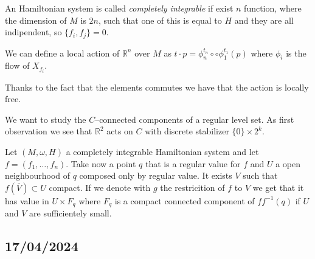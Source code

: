 \documentclass[misc]{subfiles}
\begin{document}
\begin{Dfn}
    An Hamiltonian system is called \textit{completely integrable} if exist $n$ function, where the dimension of $M$ is $2n$, such that one of this is equal to $H$ and they are all indipendent, so $\{f_i,f_j\}=0$.

    We can define a local action of $\mathbb{R}^n$ over $M$ as $t \cdot p=\phi_n^{t_n} \circ \circ \phi_1^{t_1}(p)$ where $\phi_i$ is the flow of $X_{f_i}$.
\end{Dfn}

\begin{Prp}
    Thanks to the fact that the elements commutes we have that the action is locally free.
\end{Prp}

\begin{Exp}
    We want to study the $C$--connected components of a regular level set. As first observation we see that $\mathbb{R}^2$ acts on $C$ with discrete stabilizer $\{0\} \times 2^k$.

    Let $(M,\omega,H)$ a completely integrable Hamiltonian system and let $f=(f_1,\dots,f_n)$. Take now a point $q$ that is a regular value for $f$ and $U$ a open neighbourhood of $q$ composed only by regular value. It exists $V$ such that $f(\overline{V}) \subset U$ compact. If we denote with $g$ the restricition of $f$ to $V$ we get that it has value in $U \times F_q$ where $F_q$ is a compact connected component of $ff^{-1}(q)$ if $U$ and $V$ are sufficientely small.
\end{Exp}

\subsection*{17/04/2024}
\end{document}
